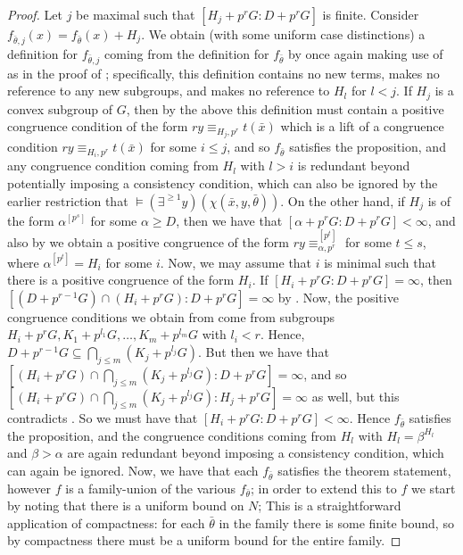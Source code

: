 \documentclass[a4paper,11pt]{article}
\newcommand{\nl}{\newline}
\begin{document}
\begin{proof}
    \nl\nl
    Let $j$ be maximal such that $[H_j+p^rG:D+p^rG]$ is finite. Consider $f_{\bar\theta, j}(x) = f_{\bar\theta}(x) +H_j$. We obtain (with some uniform case distinctions) a definition for $f_{\bar\theta, j}$ coming from the definition for $f_{\bar\theta}$ by once again making use of  as in the proof of ; specifically, this definition contains no new terms, makes no reference to any new subgroups, and makes no reference to $H_l$ for $l<j$.
    \nl\nl
    If $H_j$ is a convex subgroup of $G$, then by the above this definition must contain a positive congruence condition of the form $ry\equiv_{H_j,p^r}t(\bar x)$ which is a lift of a congruence condition $ry\equiv_{H_i,p^r}t(\bar x)$ for some $i \leq j$, and so $f_{\bar\theta}$ satisfies the proposition, and any congruence condition coming from $H_l$ with $l>i$ is redundant beyond potentially imposing a consistency condition, which can also be ignored by the earlier restriction that $\models(\exists^{\geq 1}y)(\chi(\bar x, y, \bar\theta))$.
    \nl\nl
    On the other hand, if $H_j$ is of the form $\alpha^{[p^s]}$ for some $\alpha\geq D$, then we have that $[\alpha+p^rG:D+p^rG]<\infty$, and also by  we obtain a positive congruence of the form $ry\equiv_{\alpha, p^r}^{[p^t]}$ for some $t\leq s$, where $\alpha^{[p^t]} = H_i$ for some $i$. Now, we may assume that $i$ is minimal such that there is a positive congruence of the form $H_i$.
    \nl\nl
    If $[H_i+p^rG:D+p^rG] =\infty$, then $[(D+p^{r-1}G)\cap (H_i+p^rG):D+p^rG]=\infty$ by . Now, the positive congruence conditions we obtain from  come from subgroups $H_i+p^rG,K_1+p^{l_1}G,\dots,K_m+p^{l_m}G$ with $l_i < r$. Hence, $D+p^{r-1}G\subseteq \bigcap\limits_{j\leq m}(K_j+p^{l_j}G)$. But then we have that $[(H_i+p^rG)\cap\bigcap\limits_{j\leq m}(K_j+p^{l_j}G):D+p^rG]=\infty$, and so $[(H_i+p^rG)\cap\bigcap\limits_{j\leq m}(K_j+p^{l_j}G):H_j+p^rG]=\infty$ as well, but this contradicts . So we must have that $[H_i+p^rG:D+p^rG] <\infty$. Hence $f_{\bar\theta}$ satisfies the proposition, and the congruence conditions coming from $H_l$ with $H_l = \beta^{H_l}$ and $\beta > \alpha$ are again redundant beyond imposing a consistency condition, which can again be ignored.
	\nl\nl
    Now, we have that each $f_{\bar\theta}$ satisfies the theorem statement, however $f$ is a family-union of the various $f_{\bar\theta}$; in order to extend this to $f$ we start by noting that there is a uniform bound on $N$; This is a straightforward application of compactness: for each $\bar\theta$ in the family there is some finite bound, so by compactness there must be a uniform bound for the entire family.

\end{proof}
\end{document}
